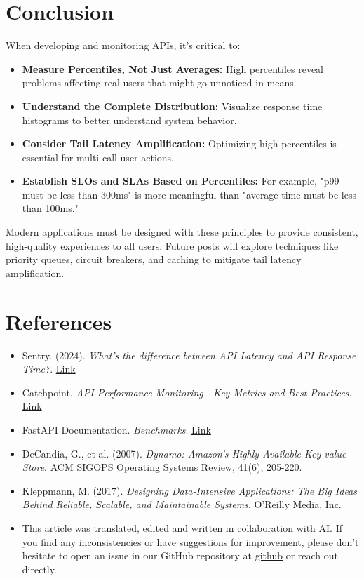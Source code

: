 \documentclass[12pt,letterpaper]{article}
\begin{document}
\section{Conclusion}

When developing and monitoring APIs, it's critical to:

\begin{itemize}
    \item \textbf{\textcolor{pythonBlue}{Measure Percentiles, Not Just Averages:}} High percentiles reveal problems affecting real users that might go unnoticed in means.
    \item \textbf{\textcolor{pythonBlue}{Understand the Complete Distribution:}} Visualize response time histograms to better understand system behavior.
    \item \textbf{\textcolor{pythonBlue}{Consider Tail Latency Amplification:}} Optimizing high percentiles is essential for multi-call user actions.
    \item \textbf{\textcolor{pythonBlue}{Establish SLOs and SLAs Based on Percentiles:}} For example, "p99 must be less than 300ms" is more meaningful than "average time must be less than 100ms."
\end{itemize}

Modern applications must be designed with these principles to provide consistent, high-quality experiences to all users. Future posts will explore techniques like priority queues, circuit breakers, and caching to mitigate tail latency amplification.

\section{References}

\begin{itemize}
    \item Sentry. (2024). \textit{What's the difference between API Latency and API Response Time?}. \href{https://blog.sentry.io/whats-the-difference-between-api-latency-and-api-response-time/#:~:text=API%20latency%20is%20the%20time,request%20and%20return%20the%20result.}{Link}
    \item Catchpoint. \textit{API Performance Monitoring—Key Metrics and Best Practices}. \href{https://www.catchpoint.com/api-monitoring-tools/api-performance-monitoring}{Link}
    \item FastAPI Documentation. \textit{Benchmarks}. \href{https://fastapi.tiangolo.com/benchmarks/}{Link}
    \item DeCandia, G., et al. (2007). \textit{Dynamo: Amazon's Highly Available Key-value Store}. ACM SIGOPS Operating Systems Review, 41(6), 205-220.
    \item Kleppmann, M. (2017). \textit{Designing Data-Intensive Applications: The Big Ideas Behind Reliable, Scalable, and Maintainable Systems}. O'Reilly Media, Inc.
    \item This article was translated, edited and written in collaboration with AI. If you find any inconsistencies or have suggestions for improvement, please don't hesitate to open an issue in our GitHub repository at \href{https://github.com/asanchezyali/social-media-posts}{github} or reach out directly.
\end{itemize}
\end{document}
